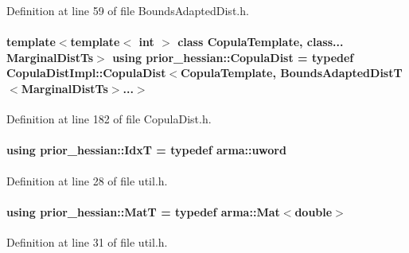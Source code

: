 Definition at line 59 of file Bounds\+Adapted\+Dist.\+h.

\paragraph[{\texorpdfstring{Copula\+Dist}{CopulaDist}}]{\setlength{\rightskip}{0pt plus 5cm}template$<$template$<$ int $>$ class Copula\+Template, class... Marginal\+Dist\+Ts$>$ using {\bf prior\+\_\+hessian\+::\+Copula\+Dist} = typedef {\bf Copula\+Dist\+Impl\+::\+Copula\+Dist}$<$Copula\+Template, {\bf Bounds\+Adapted\+DistT}$<$Marginal\+Dist\+Ts$>$...$>$}\hypertarget{namespaceprior__hessian_a40a0589f5be3c61e4c4854fcefe8855f}{}\label{namespaceprior__hessian_a40a0589f5be3c61e4c4854fcefe8855f}


Definition at line 182 of file Copula\+Dist.\+h.

\paragraph[{\texorpdfstring{IdxT}{IdxT}}]{\setlength{\rightskip}{0pt plus 5cm}using {\bf prior\+\_\+hessian\+::\+IdxT} = typedef arma\+::uword}\hypertarget{namespaceprior__hessian_aa8d589f74e88bfa3b5750118acd1ab78}{}\label{namespaceprior__hessian_aa8d589f74e88bfa3b5750118acd1ab78}


Definition at line 28 of file util.\+h.

\paragraph[{\texorpdfstring{MatT}{MatT}}]{\setlength{\rightskip}{0pt plus 5cm}using {\bf prior\+\_\+hessian\+::\+MatT} = typedef arma\+::\+Mat$<$double$>$}\hypertarget{namespaceprior__hessian_aab58331a34ed4ef22b6022564fe74be3}{}\label{namespaceprior__hessian_aab58331a34ed4ef22b6022564fe74be3}


Definition at line 31 of file util.\+h.

